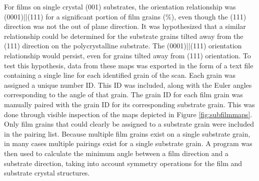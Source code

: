 For  films on single crystal  (001) substrates, the orientation
relationship was (0001)||\-(111) for a significant portion of film
grains (\%), even though the  (111) direction was not the out of
plane direction. It was hypothesized that a similar relationship could be determined for
the substrate grains tilted away from the (111) direction on the polycrystalline
substrate. The (0001)||(111) orientation relationship would persist,
even for grains tilted away from (111) orientation. To test this hypothesis, data from
these maps was exported in the form of a text file containing a single line for each
identified grain of the scan. Each grain was assigned a unique number ID. This ID was
included, along with the Euler angles corresponding to the angle of that grain.  The grain
ID for each film grain was manually paired with the grain ID for its corresponding
substrate grain. This was done through visible inspection of the maps depicted in Figure
\ref{fig:subfilmmaps}. Only film grains that could clearly be assigned to a substrate
grain were included in the pairing list. Because multiple film grains exist on a single
substrate grain, in many cases multiple pairings exist for a single substrate grain. A
program was then used to calculate the minimum angle between a film direction and a
substrate direction, taking into account symmetry operations for the film and substrate
crystal structures. 

